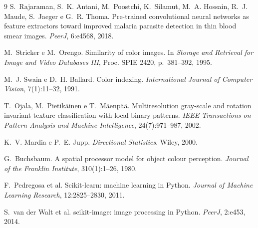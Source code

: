 \documentclass[11pt,a4paper]{article}
\begin{document}
\begin{thebibliography}{9}
S.~Rajaraman, S.~K. Antani, M.~Poostchi, K.~Silamut, M.~A. Hossain, R.~J. Maude, S.~Jaeger e
G.~R. Thoma. Pre-trained convolutional neural networks as feature extractors toward improved malaria
parasite detection in thin blood smear images. \emph{PeerJ}, 6:e4568, 2018.

M.~Stricker e M.~Orengo. Similarity of color images. In \emph{Storage and Retrieval for Image and
Video Databases III}, Proc. SPIE 2420, p.~381--392, 1995.

M.~J. Swain e D.~H. Ballard. Color indexing. \emph{International Journal of Computer Vision},
7(1):11--32, 1991.

T.~Ojala, M.~Pietikäinen e T.~Mäenpää. Multiresolution gray-scale and rotation invariant texture
classification with local binary patterns. \emph{IEEE Transactions on Pattern Analysis and Machine
Intelligence}, 24(7):971--987, 2002.

K.~V. Mardia e P.~E. Jupp. \emph{Directional Statistics}. Wiley, 2000.

G.~Buchsbaum. A spatial processor model for object colour perception. \emph{Journal of the Franklin
Institute}, 310(1):1--26, 1980.

F.~Pedregosa et al. Scikit-learn: machine learning in Python. \emph{Journal of Machine Learning
Research}, 12:2825--2830, 2011.

S.~van der Walt et al. scikit-image: image processing in Python. \emph{PeerJ}, 2:e453, 2014.
\end{thebibliography}
\end{document}
